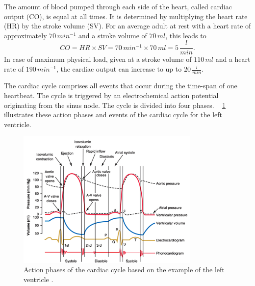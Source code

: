  The amount of blood pumped through each side of the heart,  called cardiac output (CO), is equal at all times. It is determined by multiplying the heart rate (HR) by the stroke volume (SV). For an average adult at rest with a heart rate of approximately $70\, min^{-1}$ and a stroke volume of $70 \, ml$, this leads to
 \begin{equation}
   CO = HR \times SV = 70\, min^{-1} \times 70 \,ml = 5 \,\frac{l}{min}.
  \label{eq:CO}
 \end{equation}
In case of maximum physical load, given at a stroke volume of $110\,ml$ and a heart rate of $190 \, min^{-1}$,  the cardiac output can increase to up to $20\,\frac{l}{min}$. \cite{HKS4}

The cardiac cycle comprises all events that occur during the time-span of one heartbeat. The cycle is triggered by an electrochemical action potential originating from the sinus node. The cycle is divided into four phases. \figurename~ \ref{fig:cardiac_cycle} illustrates these action phases and events of the cardiac cycle for the left ventricle.
\begin{figure}[h]
  \centering
  \includegraphics[width=0.8\textwidth]{images/cardiac_cycle.jpg}
  \caption[Action phases of left ventricular cardiac cycle \cite{GH20}]{Action phases of the cardiac cycle based on the example of the left ventricle \cite{GH20}.}
  \label{fig:cardiac_cycle}
\end{figure}
